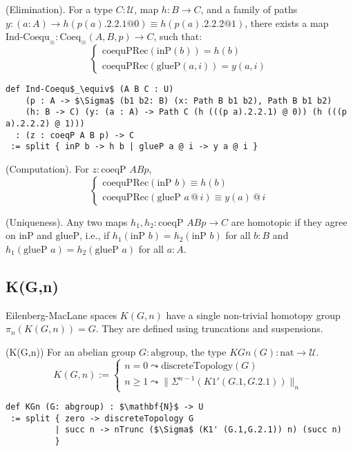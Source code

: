 \documentclass{article}
\begin{document}
\begin{theorem} (Elimination).
For a type \( C : \mathcal{U} \), map \( h : B \to C \),
and a family of paths \( y : (a : A) \to h(p(a).2.2.1  @ 0) \equiv h(p(a).2.2.2 @ 1) \),
there exists a map \( \text{Ind-Coequ}_\equiv : \text{Coeq}_\equiv(A,B,p) \to C \), such that:
\[
\begin{cases}
\text{coequPRec}(\text{inP}(b)) = h(b) \\
\text{coequPRec}(\text{glueP}(a,i)) = y(a,i)
\end{cases}
\]
\begin{lstlisting}[mathescape=true]
def Ind-Coequ$_\equiv$ (A B C : U)
    (p : A -> $\Sigma$ (b1 b2: B) (x: Path B b1 b2), Path B b1 b2)
    (h: B -> C) (y: (a : A) -> Path C (h (((p a).2.2.1) @ 0)) (h (((p a).2.2.2) @ 1)))
  : (z : coeqP A B p) -> C
 := split { inP b -> h b | glueP a @ i -> y a @ i }
\end{lstlisting}
\end{theorem}

\begin{theorem} (Computation).
For \( z : \text{coeqP } A B p \),
\[
\begin{cases}
\text{coequPRec}(\text{inP } b) \equiv h(b) \\
\text{coequPRec}(\text{glueP } a \, @ \, i) \equiv y(a) \, @ \, i
\end{cases}
\]
\end{theorem}

\begin{theorem} (Uniqueness).
Any two maps \( h_1, h_2 : \text{coeqP } A B p \to C \) are homotopic
if they agree on \( \text{inP} \) and \( \text{glueP} \), i.e.,
if \( h_1(\text{inP } b) = h_2(\text{inP } b) \) for all \( b : B \)
and \( h_1(\text{glueP } a) = h_2(\text{glueP } a) \) for all \( a : A \).
\end{theorem}

\newpage
\subsection{K(G,n)}
Eilenberg-MacLane spaces \( K(G,n) \) have a single non-trivial
homotopy group \( \pi_n(K(G,n)) = G \). They are defined using truncations and suspensions.

\begin{definition} (K(G,n))
For an abelian group \( G : \text{abgroup} \), the type \( KGn(G) : \text{nat} \to \mathcal{U} \).
\[
K(G,n) :=
\begin{cases}
n = 0 \leadsto \text{discreteTopology}(G) \\
n \geq 1 \leadsto \|\Sigma^{n-1}(K1'(G.1,G.2.1))\|_{n}
\end{cases}
\]
\begin{lstlisting}[mathescape=true]
def KGn (G: abgroup) : $\mathbf{N}$ -> U
 := split { zero -> discreteTopology G
          | succ n -> nTrunc ($\Sigma$ (K1' (G.1,G.2.1)) n) (succ n)
          }
\end{lstlisting}
\end{definition}
\end{document}
